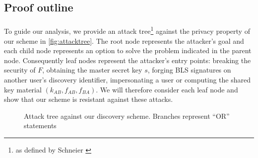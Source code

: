 	\subsection{Proof outline}
	
	\paragraph{} To guide our analysis, we provide an attack tree\footnote{as defined by Schneier \cite{attacktree}} against the privacy property of our scheme in \autoref{fig:attacktree}. The root node represents the attacker's goal and each child node represents an option to solve the problem indicated in the parent node. Consequently leaf nodes represent the attacker's entry points: breaking the security of $F$, obtaining the master secret key $s$, forging BLS signatures on another user's discovery identifier, impersonating a user or computing the shared key material $(k_{AB}, f_{AB}, f_{BA})$. We will therefore consider each leaf node and show that our scheme is resistant against these attacks.
	
	
		\begin{figure}[H]
			\begin{center}
				
				\caption{Attack tree against our discovery scheme. Branches represent ``OR'' statements}
				\label{fig:attacktree}
			\end{center}
		\end{figure}

	
	
		

